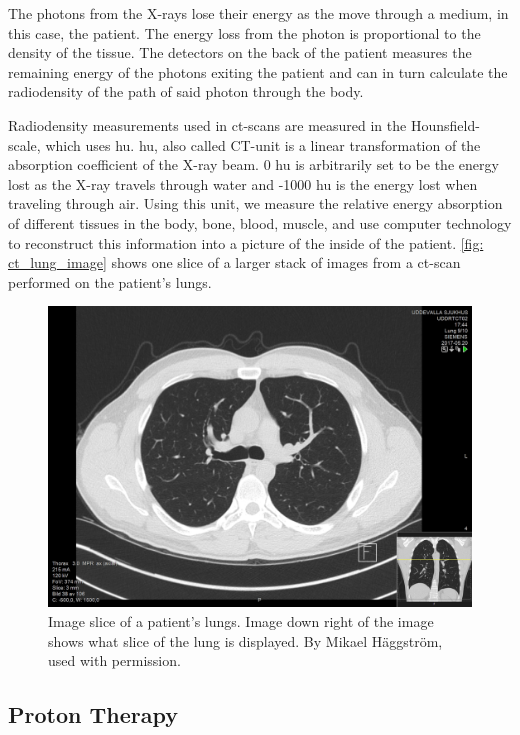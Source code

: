 \documentclass[main.tex]{subfiles}
\begin{document}
The photons from the X-rays lose their energy as the move through a medium, in this case, the patient. The energy loss from the photon is proportional to the density of the tissue. The detectors on the back of the patient measures the remaining energy of the photons exiting the patient and can in turn calculate the radiodensity of the path of said photon through the body.

Radiodensity measurements used in \gls{ct}-scans are measured in the Hounsfield-scale, which uses \gls{hu}. \gls{hu}, also called CT-unit is a linear transformation of the absorption coefficient of the X-ray beam. 0 \gls{hu} is arbitrarily set to be the energy lost as the X-ray travels through water and -1000 \gls{hu} is the energy lost when traveling through air. Using this unit, we measure the relative energy absorption of different tissues in the body, bone, blood, muscle, and use computer technology to reconstruct this information into a picture of the inside of the patient. \autoref{fig: ct_lung_image} shows one slice of a larger stack of images from a \gls{ct}-scan performed on the patient's lungs.


 \begin{figure}[!htpb]
    \centering
    \includegraphics[width=12cm ]{images/High-resolution_computed_tomograph_of_a_normal_thorax,_axial_plane_(38).jpg}
    \caption{Image slice of a patient's lungs. Image down right of the image shows what slice of the lung is displayed. By Mikael Häggström, used with permission.}
    \label{fig: ct_lung_image}
\end{figure}
\FloatBarrier 


\subsection{Proton Therapy}
\end{document}
